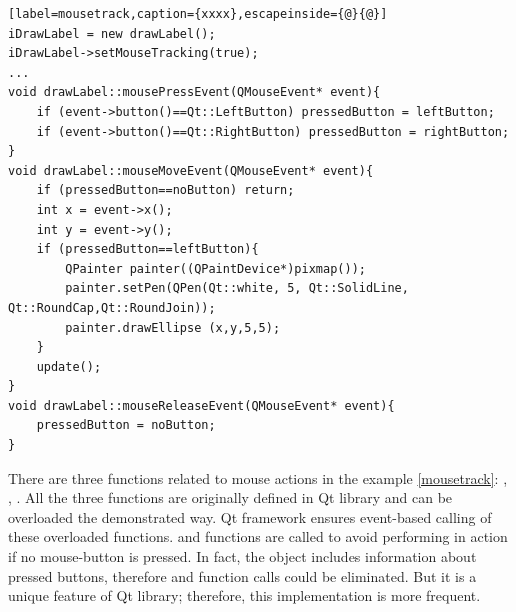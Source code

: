 \begin{lstlisting}[label=mousetrack,caption={xxxx},escapeinside={@}{@}]
iDrawLabel = new drawLabel();
iDrawLabel->setMouseTracking(true);
...
void drawLabel::mousePressEvent(QMouseEvent* event){
	if (event->button()==Qt::LeftButton) pressedButton = leftButton;
	if (event->button()==Qt::RightButton) pressedButton = rightButton;
}
void drawLabel::mouseMoveEvent(QMouseEvent* event){
	if (pressedButton==noButton) return;
	int x = event->x();
	int y = event->y();
	if (pressedButton==leftButton){
		QPainter painter((QPaintDevice*)pixmap());
		painter.setPen(QPen(Qt::white, 5, Qt::SolidLine, Qt::RoundCap,Qt::RoundJoin));
		painter.drawEllipse (x,y,5,5);
	}
	update();
}
void drawLabel::mouseReleaseEvent(QMouseEvent* event){
	pressedButton = noButton;
}
\end{lstlisting}

There are three functions related to mouse actions in the example \ref{mousetrack}: , , . All the three functions are originally defined in Qt library and can be overloaded the demonstrated way. Qt framework ensures event-based calling of these overloaded functions.  and  functions are called to avoid performing in  action if no mouse-button is pressed. In fact, the  object includes information about pressed buttons, therefore  and  function calls could be eliminated. But it is a unique feature of Qt library; therefore, this implementation is more frequent.

